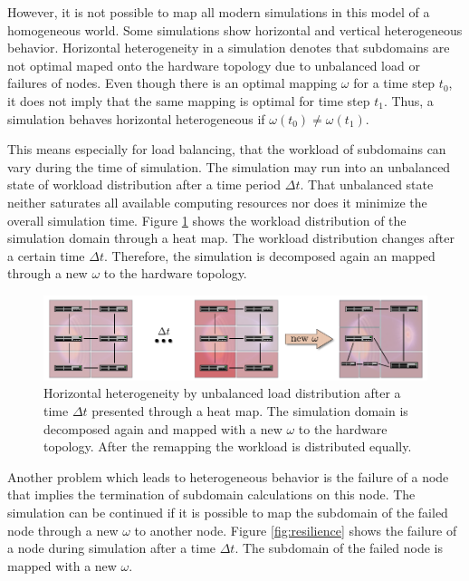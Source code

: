 However, it is not possible to map all modern simulations in this
model of a homogeneous world. Some simulations show horizontal and
vertical heterogeneous behavior. Horizontal heterogeneity in a
simulation denotes that subdomains are not optimal maped onto the
hardware topology due to unbalanced load or failures of nodes.  Even
though there is an optimal mapping $\omega$ for a time step $t_0$, it
does not imply that the same mapping is optimal for time step $t_1$.
Thus, a simulation behaves horizontal heterogeneous if $\omega(t_0)
\neq \omega(t_1)$.

This means especially for load balancing, that the workload of
subdomains can vary during the time of simulation. The simulation may
run into an unbalanced state of workload distribution after a time
period $\Delta t$. That unbalanced state neither saturates all
available computing resources nor does it minimize the overall
simulation time. Figure \ref{fig:load_balancing} shows the workload
distribution of the simulation domain through a heat map. The workload
distribution changes after a certain time $\Delta t$. Therefore, the
simulation is decomposed again an mapped through a new $\omega$ to the
hardware topology.

\begin{figure}[H]
  \centering \includegraphics[width=\textwidth]{graphics/30_load_balancing}
  \caption{Horizontal heterogeneity by unbalanced load distribution
    after a time $\Delta t$ presented through a heat map.  The
    simulation domain is decomposed again and mapped with a new
    $\omega$ to the hardware topology. After the remapping the
    workload is distributed equally.}
  \label{fig:load_balancing}
\end{figure}

\noindent Another problem which leads to heterogeneous behavior is the
failure of a node that implies the termination of subdomain
calculations on this node. The simulation can be continued if it is
possible to map the subdomain of the failed node through a new
$\omega$ to another node. Figure \ref{fig:resilience} shows the
failure of a node during simulation after a time $\Delta t$.  The
subdomain of the failed node is mapped with a new $\omega$.

